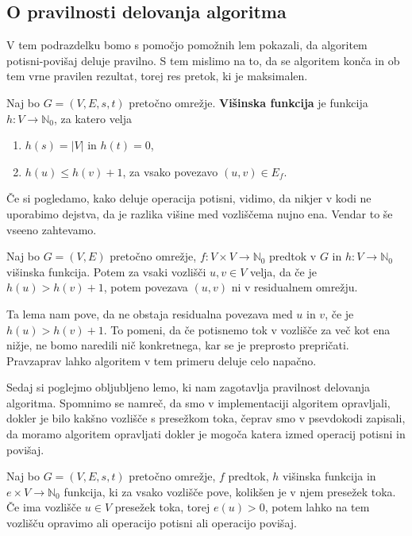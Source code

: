 \documentclass[mat1]{fmfdelo}
\newcommand{\N}{\mathbb N}
\begin{document}
\subsection{O pravilnosti delovanja algoritma}

V tem podrazdelku bomo s pomočjo pomožnih lem pokazali, da algoritem potisni-povišaj deluje pravilno. S tem mislimo na to, da se algoritem konča in ob tem vrne pravilen rezultat, torej res pretok, ki je maksimalen.

\begin{definicija}\label{def:visinska_funkcija}
Naj bo $G=(V,E,s,t)$ pretočno omrežje. \textbf{Višinska funkcija} je funkcija $h\colon V \rightarrow \N_0$, za katero velja
\begin{enumerate}
\item $h(s) = |V|$ in $h(t) = 0$,
\item $h(u) \leq h(v) + 1$, za vsako povezavo $(u,v) \in E_f$.
\end{enumerate}
\end{definicija}

Če si pogledamo, kako deluje operacija potisni, vidimo, da nikjer v kodi ne uporabimo dejstva, da je razlika višine med vozliščema nujno ena. Vendar to še vseeno zahtevamo.

\begin{lema}
Naj bo $G = (V,E)$ pretočno omrežje, $f\colon V \times V \rightarrow \N_0$ predtok v $G$ in $h\colon V \rightarrow \N_0$ višinska funkcija. Potem za vsaki vozlišči $u,v \in V$ velja, da če je $h(u) > h(v) + 1$, potem povezava $(u,v)$ ni v residualnem omrežju.
\end{lema}

Ta lema nam pove, da ne obstaja residualna povezava med $u$ in $v$, če je $h(u) > h(v) + 1$. To pomeni, da če potisnemo tok v vozlišče za več kot ena nižje, ne bomo naredili nič konkretnega, kar se je preprosto prepričati. Pravzaprav lahko algoritem v tem primeru deluje celo napačno.


Sedaj si poglejmo obljubljeno lemo, ki nam zagotavlja pravilnost delovanja algoritma. Spomnimo se namreč, da smo v implementaciji algoritem opravljali, dokler je bilo kakšno vozlišče s presežkom toka, čeprav smo v psevdokodi zapisali, da moramo algoritem opravljati dokler je mogoča katera izmed operacij potisni in povišaj.

\begin{lema}\label{lem:potisk_ali_povisanje}
Naj bo $G=(V,E,s,t)$ pretočno omrežje, $f$ predtok, $h$ višinska funkcija in $e\times V \rightarrow \N_0$ funkcija, ki za vsako vozlišče pove, kolikšen je v njem presežek toka. Če ima vozlišče $u\in V$ presežek toka, torej $e(u) > 0$, potem lahko na tem vozlišču opravimo ali operacijo potisni ali operacijo povišaj.
\end{lema}
\end{document}
